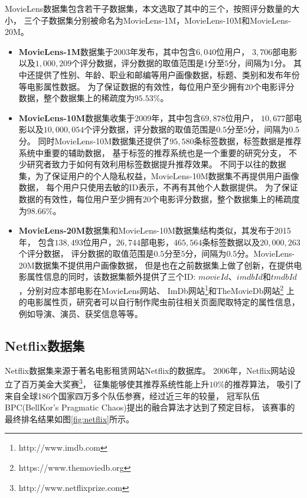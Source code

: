 MovieLens数据集包含若干子数据集，本文选取了其中的三个，按照评分数量的大小，
三个子数据集分别被命名为MovieLens-1M，MovieLens-10M和MovieLens-20M。

\begin{itemize}
\item \textbf{MovieLens-1M}数据集于2003年发布，其中包含$6,040$位用户，
$3,706$部电影以及$1,000,209$个评分数据，评分数据的取值范围是$1$分至$5$分，间隔为$1$分。
其中还提供了性别、年龄、职业和邮编等用户画像数据，标题、类别和发布年份等电影属性数据。
为了保证数据的有效性，每位用户至少拥有$20$个电影评分数据，整个数据集上的稀疏度为$95.53\%$。

\item \textbf{MovieLens-10M}数据集收集于2009年，其中包含$69,878$位用户，
$10,677$部电影以及$10,000,054$个评分数据，评分数据的取值范围是$0.5$分至$5$分，间隔为$0.5$分。
同时MovieLens-10M数据集还提供了$95,580$条标签数据，标签数据是推荐系统中重要的辅助数据，
基于标签的推荐系统也是一个重要的研究分支，
不少研究者\parencite{sigurbjornsson2008flickr,rendle2010pairwise,wang2015relational}致力于如何有效利用标签数据提升推荐效果。
不同于以往的数据集，为了保证用户的个人隐私权益，MovieLens-10M数据集不再提供用户画像数据，
每个用户只使用去敏的ID表示，不再有其他个人数据提供。
为了保证数据的有效性，每位用户至少拥有$20$个电影评分数据，整个数据集上的稀疏度为$98.66\%$。

\item \textbf{MovieLens-20M}数据集和MovieLens-10M数据集结构类似，其发布于2015年，
包含$138,493$位用户，$26,744$部电影，$465,564$条标签数据以及$20,000,263$个评分数据，
评分数据的取值范围是$0.5$分至$5$分，间隔为$0.5$分。MovieLens-20M数据集不提供用户画像数据，
但是也在之前数据集上做了创新，在提供电影属性信息的同时，该数据集额外提供了三个ID:
$movieId$、$imdbId$和$tmdbId$，分别对应本部电影在MovieLens网站、
ImDb网站\footnote{http://www.imdb.com}和TheMovieDb网站\footnote{https://www.themoviedb.org}
上的电影属性页，研究者可以自行制作爬虫前往相关页面爬取特定的属性信息，例如导演、演员、获奖信息等等。
\end{itemize}

\subsection{Netflix数据集}
Netflix数据集来源于著名电影租赁网站Netflix的数据库。
2006年，Netflix网站设立了百万美金大奖赛\footnote{http://www.netflixprize.com}，
征集能够使其推荐系统性能上升$10\%$的推荐算法，
吸引了来自全球186个国家四万多个队伍参赛，经过近三年的较量，
冠军队伍BPC(BellKor's Pragmatic Chaos)提出的融合算法才达到了预定目标，
该赛事的最终排名结果如图\ref{fig:netflix}所示。

